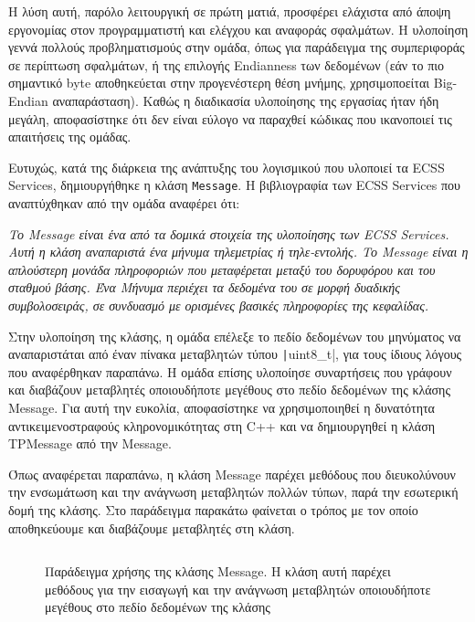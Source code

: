 \documentclass[a4paper,nobib,justified]{tufte-book}
\begin{document}
Η λύση αυτή, παρόλο λειτουργική σε πρώτη ματιά, προσφέρει ελάχιστα από άποψη εργονομίας στον προγραμματιστή και ελέγχου και αναφοράς σφαλμάτων. Η υλοποίηση γεννά πολλούς προβληματισμούς στην ομάδα, όπως για παράδειγμα της συμπεριφοράς σε περίπτωση σφαλμάτων, ή της επιλογής Endianness των δεδομένων (εάν το πιο σημαντικό byte αποθηκεύεται στην προγενέστερη θέση μνήμης, χρησιμοποείται Big-Endian αναπαράσταση). Καθώς η διαδικασία υλοποίησης της εργασίας ήταν ήδη μεγάλη, αποφασίστηκε ότι δεν είναι εύλογο να παραχθεί κώδικας που ικανοποιεί τις απαιτήσεις της ομάδας.

Ευτυχώς, κατά της διάρκεια της ανάπτυξης του λογισμικού που υλοποιεί τα ECSS Services, δημιουργήθηκε η κλάση \texttt{Message}. Η βιβλιογραφία των ECSS Services που αναπτύχθηκαν από την ομάδα αναφέρει ότι: 

\par {}\textit{Το Message είναι ένα από τα δομικά στοιχεία της υλοποίησης των ECSS Services. Αυτή η κλάση αναπαριστά ένα μήνυμα τηλεμετρίας ή τηλε-εντολής. Το Message είναι η απλούστερη μονάδα πληροφοριών που μεταφέρεται μεταξύ του δορυφόρου και του σταθμού βάσης. Ένα Μήνυμα περιέχει τα δεδομένα του σε μορφή δυαδικής συμβολοσειράς, σε συνδυασμό με ορισμένες βασικές πληροφορίες της κεφαλίδας.}

\par Στην υλοποίηση της κλάσης, η ομάδα επέλεξε το πεδίο δεδομένων του μηνύματος να αναπαριστάται από έναν πίνακα μεταβλητών τύπου \texttt|uint8_t|, για τους ίδιους λόγους που αναφέρθηκαν παραπάνω. Η ομάδα επίσης υλοποίησε συναρτήσεις που γράφουν και διαβάζουν μεταβλητές οποιουδήποτε μεγέθους στο πεδίο δεδομένων της κλάσης Message. Για αυτή την ευκολία, αποφασίστηκε να χρησιμοποιηθεί η δυνατότητα αντικειμενοστραφούς κληρονομικότητας στη C++ και να δημιουργηθεί η κλάση TPMessage από την Message.

Όπως αναφέρεται παραπάνω, η κλάση Message παρέχει μεθόδους που διευκολύνουν την ενσωμάτωση και την ανάγνωση μεταβλητών πολλών τύπων, παρά την εσωτερική δομή της κλάσης. Στο παράδειγμα παρακάτω φαίνεται ο τρόπος με τον οποίο αποθηκεύουμε και διαβάζουμε μεταβλητές στη κλάση.

\begin{figure}
	\inputminted{cpp}{code/examples/ecss-message-usage.cpp}
	\label{code:ecss-message-usage}
	\caption[Παράδειγμα χρήσης της κλάσης Message]{Παράδειγμα χρήσης της κλάσης Message. Η κλάση αυτή παρέχει μεθόδους για την εισαγωγή και την ανάγνωση μεταβλητών οποιουδήποτε μεγέθους στο πεδίο δεδομένων της κλάσης}
\end{figure}
\end{document}
